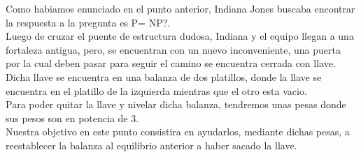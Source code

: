 Como habiamos enunciado en el punto anterior, Indiana Jones buscaba encontrar la respuesta a la pregunta es P= NP?.\\

Luego de cruzar el puente de estructura dudosa, Indiana y el equipo llegan a una fortaleza antigua, pero, se encuentran con un nuevo inconveniente, una puerta por la cual deben pasar para seguir el camino se encuentra cerrada con llave.\\

Dicha llave se encuentra en una balanza de dos platillos, donde la llave se encuentra en el platillo de la izquierda mientras que el otro esta vacio.\\

Para poder quitar la llave y nivelar dicha balanza, tendremos unas pesas donde sus pesos son en potencia de 3.\\

Nuestra objetivo en este punto consistira en ayudarlos, mediante dichas pesas, a reestablecer la balanza al equilibrio anterior a haber sacado la llave.\\





